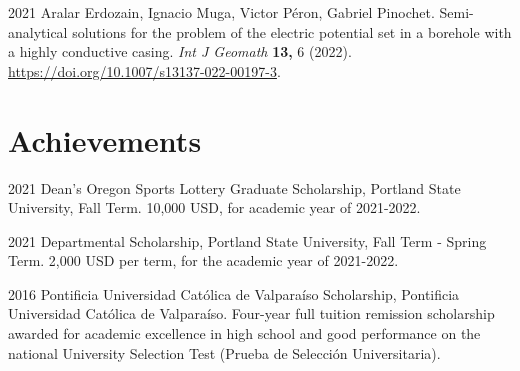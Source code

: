 \documentclass[12pt,letterpaper]{report}
\begin{document}
    \begin{tablist}

	\item[2021] \tab Aralar Erdozain, Ignacio Muga, Victor P\'eron, Gabriel Pinochet. Semi-analytical solutions for the problem of the electric potential set in a borehole with a highly conductive casing. \textit{Int J Geomath} \textbf{13,} 6 (2022). \href{https://doi.org/10.1007/s13137-022-00197-3}{https://doi.org/10.1007/s13137-022-00197-3}.

    \end{tablist}

    \section*{Achievements}

    \begin{tablist}

        \item[2021] \tab Dean's Oregon Sports Lottery Graduate Scholarship, Portland State University, Fall Term. 10,000 USD, for academic year of 2021-2022.

        \item[2021] \tab Departmental Scholarship, Portland State University, Fall Term - Spring Term. 2,000 USD per term, for the academic year of 2021-2022.


        \item[2016] \tab Pontificia Universidad Cat\'olica de Valpara\'iso Scholarship, Pontificia Universidad Cat\'olica de Valpara\'iso. Four-year full tuition remission scholarship awarded for academic excellence in high school and good performance on the national University Selection Test (Prueba de Selecci\'on Universitaria).

    \end{tablist}



\end{document}
